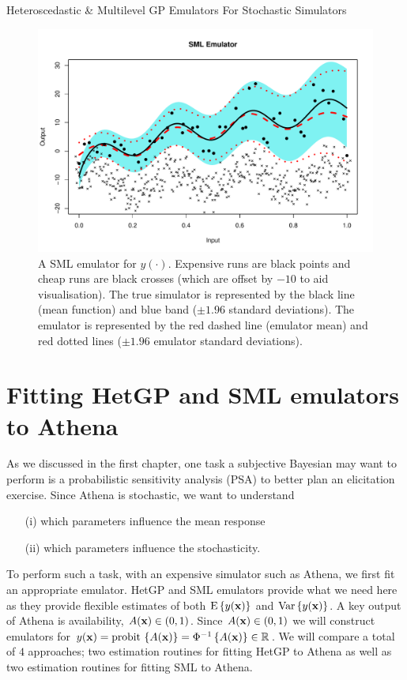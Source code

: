 \begin{chapter}{Heteroscedastic \& Multilevel GP Emulators For Stochastic Simulators\label{Ch:Hetsml}}
\begin{figure}[ht]
	\includegraphics[width=\textwidth]{sml-het-fig2/toy-sml.pdf}
	\caption{A SML emulator for $y(\cdot)$. Expensive runs are black points and cheap runs are black crosses (which are offset by $-10$ to aid visualisation). The true simulator is represented by the black line (mean function) and blue band ($\pm 1.96$ standard deviations). The emulator is represented by the red dashed line (emulator mean) and red dotted lines ($\pm 1.96$ emulator standard deviations).\label{Fig:comparison}}
\end{figure}

\section{Fitting HetGP and SML emulators to Athena \label{sec:fitting}}
As we discussed in the first chapter, one task a subjective Bayesian may want to perform is a probabilistic sensitivity analysis (PSA) to better plan an elicitation exercise. Since Athena is stochastic, we want to understand
\begin{itemize}
	\item[(i)] which parameters influence the mean response
	\item[(ii)] which parameters influence the stochasticity.
\end{itemize}
To perform such a task, with an expensive simulator such as Athena, we first fit an appropriate emulator. HetGP and SML emulators provide what we need here as they provide flexible estimates of both $\textrm{E}\,\{y(\mathbf{x})\}$ and $\mathrm{Var}\,\{y(\mathbf{x})\}$. A key output of Athena is availability, $A(\mathbf{x}) \in (0,1)$. Since $A(\mathbf{x}) \in (0,1)$ we will construct emulators for $y(\mathbf{x}) = \text{probit}\, \left\{A(\mathbf{x})\right\} = \Phi^{-1}\left\{A(\mathbf{x})\right\} \in \mathbb{R}$. We will compare a total of $4$ approaches; two estimation routines for fitting HetGP to Athena as well as two estimation routines for fitting SML to Athena.


\end{chapter}
